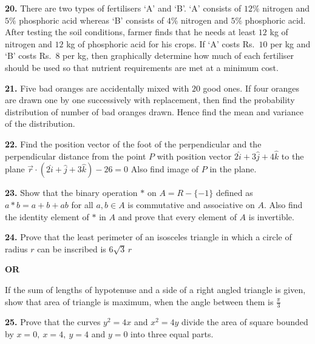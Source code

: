 \documentclass[12pt]{article}
\begin{document}
\vspace{0.2cm}

\textbf{20.} There are two types of fertilisers `A' and `B'. `A' consists of $12\%$ nitrogen and $5\%$ phosphoric acid whereas `B' consists of $4\%$ nitrogen and $5\%$ phosphoric acid. After testing the soil conditions, farmer finds that he needs at least $12$ kg of nitrogen and $12$ kg of phosphoric acid for his crops. If `A' costs Rs.\ $10$ per kg and `B' costs Rs.\ $8$ per kg, then graphically determine how much of each fertiliser should be used so that nutrient requirements are met at a minimum cost.

\vspace{0.2cm}

\textbf{21.} Five bad oranges are accidentally mixed with $20$ good ones. If four oranges are drawn one by one successively with replacement, then find the probability distribution of number of bad oranges drawn. Hence find the mean and variance of the distribution.

\vspace{0.2cm}

\textbf{22.} Find the position vector of the foot of the perpendicular and the perpendicular distance from the point $P$ with position vector
$
2\hat{i}+3\hat{j}+4\hat{k}
$
to the plane
$
\vec{r}\cdot(2\hat{i}+\hat{j}+3\hat{k})-26=0
$
Also find image of $P$ in the plane.

\vspace{0.2cm}

\textbf{23.} Show that the binary operation $*$ on
$
A=R-\{-1\}
$
defined as
$
a*b=a+b+ab
$
for all $a,b\in A$ is commutative and associative on $A$. Also find the identity element of $*$ in $A$ and prove that every element of $A$ is invertible.

\vspace{0.2cm}

\textbf{24.} Prove that the least perimeter of an isosceles triangle in which a circle of radius $r$ can be inscribed is
$
6\sqrt{3}\,r
$

\textbf{OR}

If the sum of lengths of hypotenuse and a side of a right angled triangle is given, show that area of triangle is maximum, when the angle between them is
$
\frac{\pi}{3}
$

\vspace{0.2cm}

\textbf{25.} Prove that the curves
$
y^2=4x
$
and
$
x^2=4y
$
divide the area of square bounded by
$
x=0,\ x=4,\ y=4
$
and
$
y=0
$
into three equal parts.
\end{document}
